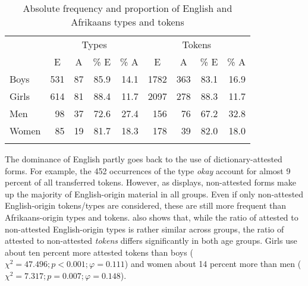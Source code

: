 \documentclass[output=paper]{langsci/langscibook}
\begin{document}
  

  
\begin{table}
\begin{tabular}{lrrrrrrrr}
\lsptoprule
& \multicolumn{4}{c}{Types} & \multicolumn{4}{c}{Tokens}\\\cmidrule(lr){2-5}\cmidrule(lr){6-9}
		& \multicolumn{1}{c}{E} & \multicolumn{1}{c}{A} & \multicolumn{1}{c}{\% E} & \multicolumn{1}{c}{\% A} & \multicolumn{1}{c}{E} & \multicolumn{1}{c}{A} & \multicolumn{1}{c}{\% E} & \multicolumn{1}{c}{\% A}\\
\midrule
Boys & 531 & 87 & 85.9 & 14.1 & 1782 & 363 & 83.1 & 16.9\\
Girls & 614 & 81 & 88.4 & 11.7 & 2097 & 278 & 88.3 & 11.7\\
Men & 98 & 37 & 72.6 & 27.4 & 156 & 76 & 67.2 & 32.8\\
Women & 85 & 19 & 81.7 & 18.3 & 178 & 39 & 82.0 & 18.0\\
\lspbottomrule
\end{tabular}
\caption{Absolute frequency and proportion of English and Afrikaans types and tokens\label{tab:bracke:7}}
\end{table}  

The dominance of English partly goes back to the use of dictionary-attested forms. For example, the 452 occurrences of the type \textit{okay} account for almost 9 percent of all transferred tokens. However, as  displays, non-attested forms make up the majority of English-origin material in all groups. Even if only non-attested English-origin tokens/types are considered, these are still more frequent than Afrikaans-origin types and tokens.  also shows that, while the ratio of attested to non-attested English-origin types is rather similar across groups, the ratio of attested to non-attested \textit{tokens} differs significantly in both age groups. Girls use about ten percent more attested tokens than boys ($\chi^2 = 47.496; p < 0.001; \varphi = 0.111$) and women about 14 percent more than men ($\chi^2 = 7.317; p = 0.007; \varphi = 0.148$).
\end{document}
